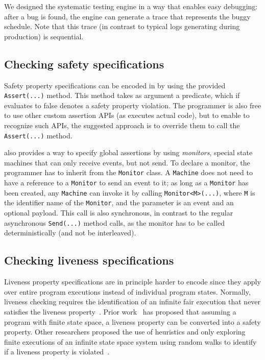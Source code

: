 We designed the systematic testing engine in a way that enables easy debugging: after a bug is found, the engine can generate a trace that represents the buggy schedule. Note that this trace (in contrast to typical logs generating during production) is sequential.

\subsection{Checking safety specifications}
\label{sec:psharp:safety}

Safety property specifications can be encoded in \psharp by using the provided \texttt{Assert(...)} method. This method takes as argument a predicate, which if evaluates to false denotes a safety property violation. The programmer is also free to use other custom assertion APIs (as \psharp executes actual code), but to enable \psharp to recognize such APIs, the suggested approach is to override them to call the \psharp \texttt{Assert(...)} method.

\psharp also provides a way to specify global assertions by using \emph{monitors}, special state machines that
can only receive events, but not send. To declare a monitor, the programmer has to inherit from the \psharp \texttt{Monitor} class. A \texttt{Machine} does not need to have a reference to a \texttt{Monitor} to send an event to it; as long as a \texttt{Monitor} has been created, any \texttt{Machine} can invoke it by calling \texttt{Monitor<M>(...)}, where \texttt{M} is the identifier name of the \texttt{Monitor}, and the parameter is an event and an optional payload. This call is also synchronous, in contrast to the regular asynchronous \texttt{Send(...)} method calls, as the monitor has to be called deterministically (and not be interleaved).

\subsection{Checking liveness specifications}
\label{sec:psharp:liveness}

Liveness property specifications are in principle harder to encode since they apply over entire program executions instead of individual program states. Normally, liveness checking requires the identification of an infinite fair execution that never satisfies the liveness property~\cite{schuppan2004efficient, musuvathi2008fair}. Prior work~\cite{schuppan2004efficient} has proposed that assuming a program with finite state space, a liveness property can be converted into a safety property. Other researchers proposed the use of heuristics and only exploring finite executions of an infinite state space system using random walks to identify if a liveness property is violated~\cite{killian2007life}.

